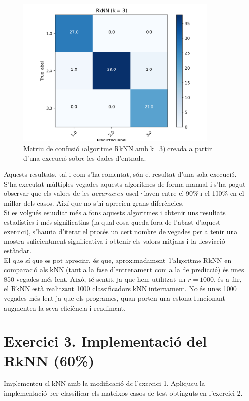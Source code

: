 \documentclass{article} %
\begin{document}
{	\begin{figure}[H]
		\includegraphics[width=10cm]{r3nn}
		\centering
		\color{blue}
		\caption{Matriu de confusió (algoritme RkNN amb k=3) creada a partir d'una execució sobre les dades d'entrada.}\label{visina8}
	\end{figure}

	Aquests resultats, tal i com s'ha comentat, són el resultat d'una sola execució. S'ha executat múltiples vegades aquests algoritmes de forma manual i s'ha pogut observar que els valors de les $accuracies$ oscil·laven entre el 90\% i el 100\% en el millor dels casos. Així que no s'hi aprecien grans diferències. \\

	Si es volgués estudiar més a fons aquests algoritmes i obtenir uns resultats estadístics i més significatius (la qual cosa queda fora de l'abast d'aquest exercici), s'hauria d'iterar el procés un cert nombre de vegades per a tenir una mostra suficientment significativa i obtenir els valors mitjans i la desviació estàndar. \\

	El que sí que es pot apreciar, és que, aproximadament, l'algoritme RkNN en comparació als kNN (tant a la fase d'entrenament com a la de predicció) és unes 850 vegades més lent. Això, té sentit, ja que hem utilitzat un $r = 1000$, és a dir, el RkNN està realitzant 1000 classificadors kNN internament. No és unes 1000 vegades més lent ja que els programes, quan porten una estona funcionant augmenten la seva eficiència i rendiment.
}

\section{Exercici 3. Implementació del RkNN (60\%)}
Implementeu el kNN amb la modificació de l'exercici 1. Apliqueu la implementació per classificar els mateixos casos de test obtinguts en l’exercici 2. \\
\end{document}
